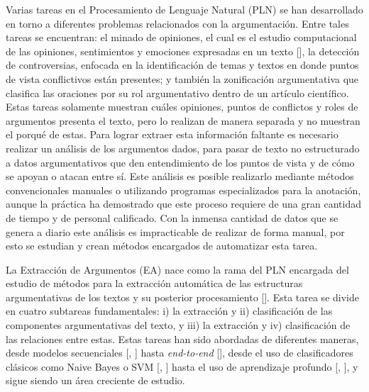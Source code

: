 Varias tareas en el Procesamiento de Lenguaje Natural (PLN) se han desarrollado en 
torno a diferentes problemas relacionados con 
la argumentación. Entre tales tareas se encuentran: el minado de opiniones, el cual es el 
estudio computacional de las opiniones, sentimientos y emociones expresadas en un texto 
[\cite{liu2010sentiment}], la detección de controversias, enfocada en la identificación de 
temas y textos en donde puntos de vista conflictivos están presentes; y también la zonificación
argumentativa que clasifica las oraciones por su rol argumentativo dentro de un artículo
científico. Estas tareas solamente muestran cuáles opiniones, puntos de conflictos y roles 
de argumentos 
presenta el texto, pero lo realizan de manera separada y no muestran el porqué de estas. 
Para lograr extraer esta información faltante es necesario realizar un 
análisis de los argumentos dados, para pasar de texto no estructurado a datos argumentativos 
que den entendimiento de los puntos de vista y de cómo se apoyan o atacan entre sí. Este análisis
es posible realizarlo mediante métodos convencionales manuales o utilizando programas
especializados para la anotación, aunque la práctica ha demostrado que este proceso requiere 
de una gran cantidad de tiempo y de personal calificado. Con la inmensa cantidad de datos 
que se genera a diario este análisis es impracticable de realizar de forma manual, por esto se 
estudian y crean métodos encargados de automatizar esta tarea.


La Extracción de Argumentos (EA) nace como la rama del PLN encargada
del estudio de métodos para la extracción automática de las estructuras argumentativas de 
los textos y su posterior procesamiento [\cite{lawrence2020argument}]. Esta tarea se divide en 
cuatro subtareas fundamentales: i) la extracción y ii) clasificación de las componentes 
argumentativas del texto, y iii) la extracción y 
iv) clasificación de las relaciones entre estas. Estas tareas han sido abordadas de diferentes maneras,
desde modelos secuenciales [\cite{palau2009argumentation}, \cite{goudas2015argument}] hasta 
\emph{end-to-end} [\cite{eger2017neural}], desde el uso de clasificadores clásicos 
como Naive Bayes o SVM [\cite{niculae2017argument}, \cite{stab2017parsing}] hasta el uso de 
aprendizaje profundo [\cite{galassi2021deep}, \cite{mayer2020transformer}], y sigue 
siendo un área creciente de estudio.


